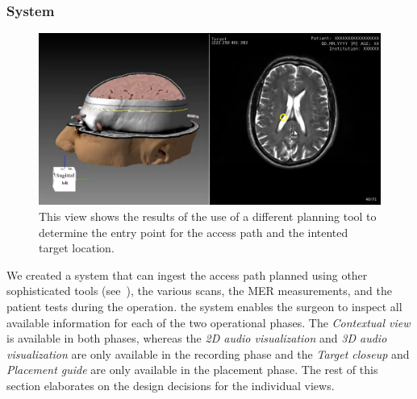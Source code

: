 \subsubsection{System}
\label{contributions:medbio:dbs:system}
\begin{figure}
\includegraphics[width=\linewidth]{figures/contributions/dbs/planning.png}
\caption{This view shows the results of the use of a different planning tool to determine the entry point for the access path and the intented target location.}
\label{contributions:medbio:dbs:planning}
\end{figure}
We created a system that can ingest the access path planned using other sophisticated tools (see~), the various scans, the MER measurements, and the patient tests during the operation. the system enables the surgeon to inspect all available information for each of the two operational phases. The \emph{Contextual view} is available in both phases, whereas the \emph{2D audio visualization} and \emph{3D audio visualization} are only available in the recording phase and the \emph{Target closeup} and \emph{Placement guide} are only available in the placement phase. The rest of this section elaborates on the design decisions for the individual views.


